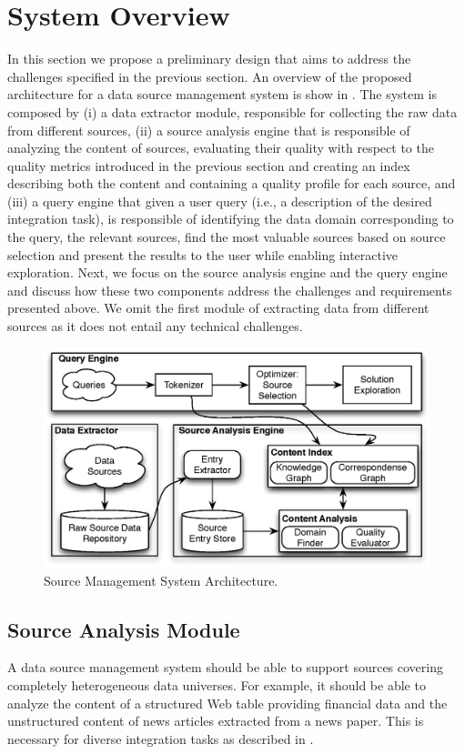 \documentclass{sig-alternate}
\begin{document}
\section{System Overview}
\label{sec:overview}
In this section we propose a preliminary design that aims to address the challenges specified in the previous section. An overview of the proposed architecture for a data source management system is show in . The system is composed by (i) a data extractor module, responsible for collecting the raw data from different sources, (ii) a source analysis engine that is responsible of analyzing the content of sources, evaluating their quality with respect to the quality metrics introduced in the previous section and creating an index describing both the content and containing a quality profile for each source, and (iii) a query engine that given a user query (i.e., a description of the desired integration task), is responsible of identifying the data domain corresponding to the query, the relevant sources, find the most valuable sources based on source selection and present the results to the user while enabling interactive exploration. Next, we focus on the source analysis engine and the query engine and discuss how these two components address the challenges and requirements presented above. We omit the first module of extracting data from different sources as it does not entail any technical challenges.

\begin{figure}
	\begin{center}
	\includegraphics[clip,scale=0.5]{fig/system.eps}
	\caption{Source Management System Architecture.}
	\label{fig:system}
	\end{center}
\end{figure}


\subsection{Source Analysis Module}
A data source management system should be able to support sources covering completely heterogeneous data universes. For example, it should be able to analyze the content of a structured Web table providing financial data and the unstructured content of news articles extracted from a news paper. This is necessary for diverse integration tasks as described in . 
\end{document}

